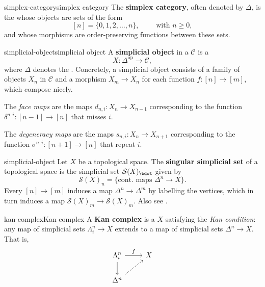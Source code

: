 \begin{topic}{simplex-category}{simplex category}
    The \textbf{simplex category}, often denoted by $\Delta$, is the  whose objects are sets of the form
    \[ [n] = \{ 0, 1, 2, \ldots, n \}, \qquad \text{ with } n \ge 0 , \]
    and whose morphisms are order-preserving functions between these sets.
\end{topic}

\begin{topic}{simplicial-object}{simplicial object}
    A \textbf{simplicial object} in a  $\mathcal{C}$ is a 
    \[ X : \Delta^\text{op} \to \mathcal{C} , \]
    where $\Delta$ denotes the . Concretely, a simplicial object consists of a family of objects $X_n$ in $\mathcal{C}$ and a morphism $X_m \to X_n$ for each function $f : [n] \to [m]$, which compose nicely.
    
    The \textit{face maps} are the maps $d_{n, i} : X_n \to X_{n - 1}$ corresponding to the function $\delta^{n, i} : [n - 1] \to [n]$ that misses $i$.
    
    The \textit{degeneracy maps} are the maps $s_{n, i} : X_n \to X_{n + 1}$ corresponding to the function $\sigma^{n, i} : [n + 1] \to [n]$ that repeat $i$.
\end{topic}

\begin{example}{simplicial-object}
    Let $X$ be a topological space. The \textbf{singular simplicial set} of a topological space is the simplicial set $\mathcal{S}(X)_\bdot$ given by
    \[ \mathcal{S}(X)_n = \{ \text{cont. maps } \Delta^n \to X \} . \]
    Every $[n] \to [m]$ induces a map $\Delta^n \to \Delta^m$ by labelling the vertices, which in turn induces a map $\mathcal{S}(X)_m \to \mathcal{S}(X)_m$. Also see .
\end{example}

\begin{topic}{kan-complex}{Kan complex}
    A \textbf{Kan complex} is a  $X$ satisfying the \textit{Kan condition}: any map of simplicial sets $\Lambda^n_i \to X$ extends to a map of simplicial sets $\Delta^n \to X$. That is,
    \[ \begin{tikzcd} \Lambda^n_i \arrow{r}{f} \arrow{d} & X \\ \Delta^n \arrow[dashed]{ur} & \end{tikzcd} \]
\end{topic}

